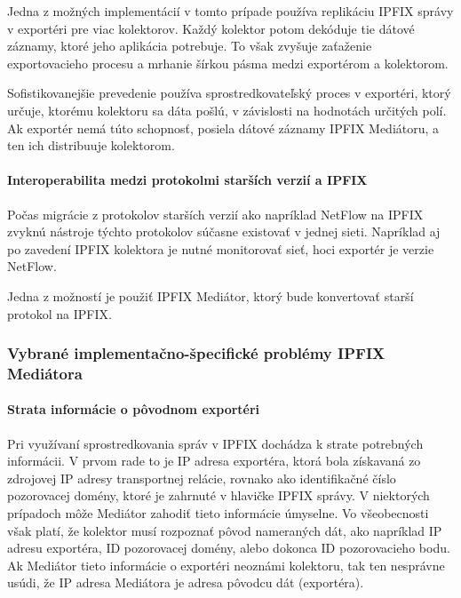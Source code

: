 Jedna z možných implementácií v tomto prípade používa replikáciu IPFIX správy v exportéri 
pre viac kolektorov. Každý kolektor potom dekóduje tie dátové záznamy, ktoré jeho aplikácia
potrebuje. To však zvyšuje zaťaženie exportovacieho procesu a mrhanie šírkou pásma medzi
exportérom a kolektorom.

Sofistikovanejšie prevedenie používa sprostredkovateľský proces v exportéri, ktorý určuje, 
ktorému kolektoru sa dáta pošlú, v závislosti na hodnotách určitých polí. Ak exportér nemá
túto schopnosť, posiela dátové záznamy IPFIX Mediátoru, a ten ich distribuuje kolektorom.


\paragraph{Interoperabilita medzi protokolmi starších verzií a IPFIX}

Počas migrácie z protokolov starších verzií ako napríklad NetFlow \citep{rfc3954} na IPFIX
zvyknú nástroje týchto protokolov súčasne existovať v jednej sieti. Napríklad aj po zavedení 
IPFIX kolektora je nutné monitorovať sieť, hoci exportér je verzie NetFlow.

Jedna z možností je použiť IPFIX Mediátor, ktorý bude konvertovať starší protokol na IPFIX.



\subsubsection{Vybrané implementačno-špecifické problémy IPFIX Mediátora} \label{sec:problems}


\paragraph{Strata informácie o pôvodnom exportéri} \label{sec:loss_info}

Pri využívaní sprostredkovania správ v IPFIX dochádza k strate potrebných informácii. V prvom rade to je 
IP adresa exportéra, ktorá bola získavaná zo zdrojovej IP adresy transportnej relácie, rovnako 
ako identifikačné číslo pozorovacej domény, ktoré je zahrnuté v hlavičke IPFIX správy.
V niektorých prípadoch môže Mediátor zahodiť tieto informácie úmyselne. 
Vo všeobecnosti však platí, že kolektor musí rozpoznať pôvod nameraných dát, ako napríklad IP adresu 
exportéra, ID pozorovacej domény, alebo dokonca ID pozorovacieho bodu. Ak Mediátor tieto informácie 
o exportéri neoznámi kolektoru, tak ten nesprávne usúdi, že IP adresa Mediátora je adresa pôvodcu dát 
(exportéra).

